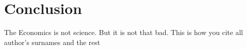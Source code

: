 \documentclass[../main.tex]{subfiles}
\begin{document}
\section{Conclusion}

The Economics is not science. \cite{knuthwebsite} But it is not that bad. This is how you cite all author's surnames \cite{latexcompanion} and the rest\cite{dirac,einstein,knuth-fa,knuthwebsite}
\end{document}
